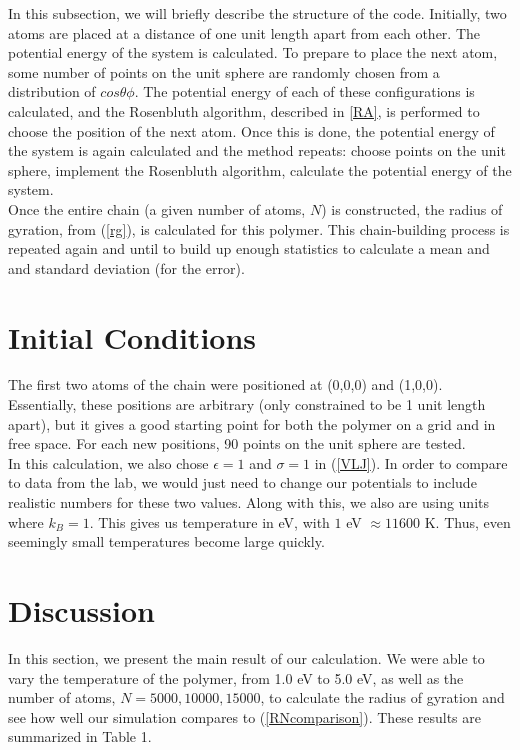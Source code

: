 \documentclass{article}
\begin{document}
\begin{multicols}{2}
In this subsection, we will briefly describe the structure of the code.  Initially, two atoms are placed at a distance of one unit length apart from each other.  The potential energy of the system is calculated.  To prepare to place the next atom, some number of points on the unit sphere are randomly chosen from a distribution of $cos\theta \phi$.  The potential energy of each of these configurations is calculated, and the Rosenbluth algorithm, described in \ref{RA}, is performed to choose the position of the next atom.  Once this is done, the potential energy of the system is again calculated and the method repeats:  choose points on the unit sphere, implement the Rosenbluth algorithm, calculate the potential energy of the system.  \\

Once the entire chain (a given number of atoms, $N$) is constructed, the radius of gyration, from (\ref{rg}), is calculated for this polymer.  This chain-building process is repeated again and until to build up enough statistics to calculate a mean and and standard deviation (for the error).  

\section{Initial Conditions}
\label{IC}

The first two atoms of the chain were positioned at (0,0,0) and (1,0,0).  Essentially, these positions are arbitrary (only constrained to be 1 unit length apart), but it gives a good starting point for both the polymer on a grid and in free space.   For each new positions, 90 points on the unit sphere are tested.  \\

In this calculation, we also chose $\epsilon =1$ and $\sigma=1$ in (\ref{VLJ}).  In order to compare to data from the lab, we would just need to change our potentials to include realistic numbers for these two values.  Along with this, we also are using units where $k_B=1$.  This gives us temperature in eV, with $1$ eV $\approx 11600$ K.  Thus, even seemingly small temperatures become large quickly.\\

\section{Discussion}
\label{discuss}

In this section, we present the main result of our calculation.  We were able to vary the temperature of the polymer, from 1.0 eV to 5.0 eV, as well as the number of atoms, $N=5000, 10000, 15000$, to calculate the radius of gyration and see how well our simulation compares to (\ref{RNcomparison}).  These results are summarized in Table 1.  \\


\end{multicols}
\end{document}

